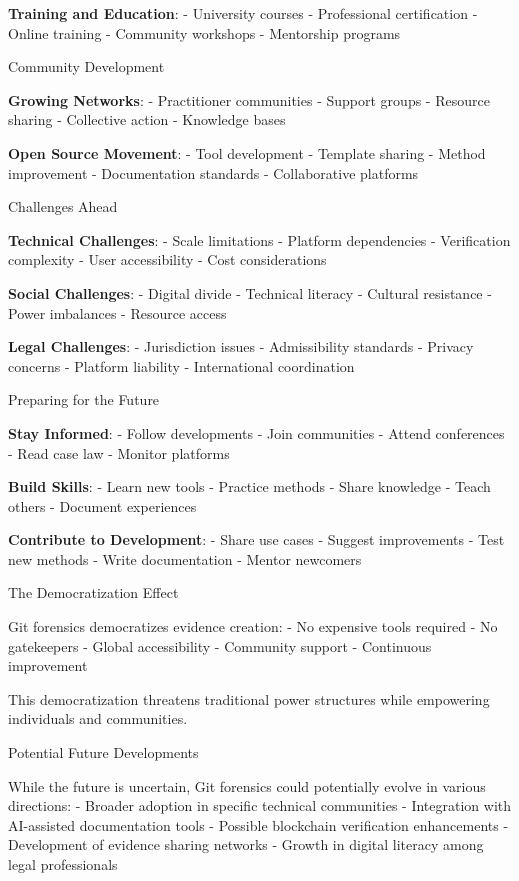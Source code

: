 \textbf{Training and Education}: - University courses - Professional
certification - Online training - Community workshops - Mentorship
programs

Community Development

\textbf{Growing Networks}: - Practitioner communities - Support groups -
Resource sharing - Collective action - Knowledge bases

\textbf{Open Source Movement}: - Tool development - Template sharing -
Method improvement - Documentation standards - Collaborative platforms

Challenges Ahead

\textbf{Technical Challenges}: - Scale limitations - Platform
dependencies - Verification complexity - User accessibility - Cost
considerations

\textbf{Social Challenges}: - Digital divide - Technical literacy -
Cultural resistance - Power imbalances - Resource access

\textbf{Legal Challenges}: - Jurisdiction issues - Admissibility
standards - Privacy concerns - Platform liability - International
coordination

Preparing for the Future

\textbf{Stay Informed}: - Follow developments - Join communities -
Attend conferences - Read case law - Monitor platforms

\textbf{Build Skills}: - Learn new tools - Practice methods - Share
knowledge - Teach others - Document experiences

\textbf{Contribute to Development}: - Share use cases - Suggest
improvements - Test new methods - Write documentation - Mentor newcomers

The Democratization Effect

Git forensics democratizes evidence creation: - No expensive tools
required - No gatekeepers - Global accessibility - Community support -
Continuous improvement

This democratization threatens traditional power structures while
empowering individuals and communities.

Potential Future Developments

While the future is uncertain, Git forensics could potentially evolve in
various directions: - Broader adoption in specific technical communities
- Integration with AI-assisted documentation tools - Possible blockchain
verification enhancements - Development of evidence sharing networks -
Growth in digital literacy among legal professionals


